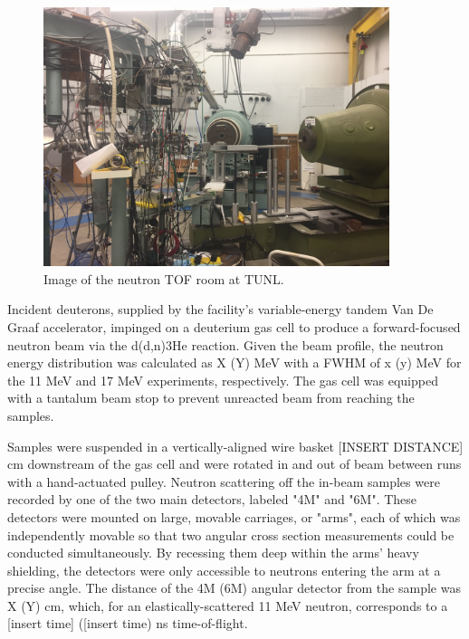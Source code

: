 \begin{figure}
  \begin{center}
\includegraphics[width = 0.9\textwidth]{figures/TOFRoomPhoto.jpg}
\caption{Image of the neutron TOF room at TUNL.} 
\label{TOFRoomPhoto}
\end{center}
\end{figure}

Incident deuterons, supplied by the facility's variable-energy tandem
    Van De Graaf accelerator, impinged on a deuterium gas cell to produce a
forward-focused neutron beam via the d(d,n)3He reaction. Given the beam profile,
    the neutron energy distribution was calculated as X (Y) MeV with a FWHM of x (y)
    MeV for the 11 MeV and 17 MeV experiments, respectively. The gas cell was
    equipped with a tantalum beam stop to prevent unreacted beam from reaching
    the samples. 

    Samples were suspended in a vertically-aligned wire basket [INSERT DISTANCE] cm
    downstream of the gas cell and were rotated in and out of beam between
    runs with a hand-actuated pulley. Neutron scattering off
    the in-beam samples were recorded by one of the two main detectors, labeled "4M"
    and "6M". These detectors were mounted on large, movable carriages, or "arms",
    each of which was independently movable so that two angular cross section
    measurements could be conducted simultaneously. By recessing them deep within
    the arms' heavy shielding, the detectors were only accessible to neutrons
    entering the arm at a precise angle. The distance of the 4M (6M) angular
    detector from the sample was X (Y) cm, which, for an elastically-scattered
    11 MeV neutron, corresponds to a [insert time] ([insert time) ns time-of-flight.

